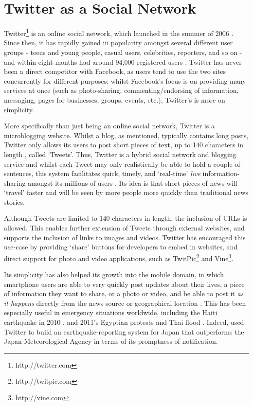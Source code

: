 \section{Twitter as a Social Network}
Twitter\footnote{http://twitter.com} is an online social network, which launched in the summer of 2006 \cite{krishnamurthy08}. Since then, it has rapidly gained in popularity amongst several different user groups - teens and young people, casual users, celebrities, reporters, and so on - and within eight months had around 94,000 registered users \cite{java07}. Twitter has never been a direct competitor with Facebook, as users tend to use the two sites concurrently for different purposes: whilst Facebook's focus is on providing many services at once (such as photo-sharing, commenting/endorsing of information, messaging, pages for businesses, groups, events, etc.), Twitter's is more on simplicity.

More specifically than just being an online social network, Twitter is a microblogging website. Whilst a blog, as mentioned, typically contains long posts, Twitter only allows its users to post short pieces of text, up to 140 characters in length \cite{krishnamurthy08, huberman08}, called `Tweets'. Thus, Twitter is a hybrid social network and blogging service and whilst each Tweet may only realistically be able to hold a couple of sentences, this system facilitates quick, timely, and `real-time' \textit{live} information-sharing amongst its millions of users \cite{zhao09}. Its idea is that short pieces of news will `travel' faster and will be seen by more people more quickly than traditional news stories.

Although Tweets are limited to 140 characters in length, the inclusion of URLs is allowed. This enables further extension of Tweets through external websites, and supports the inclusion of links to images and videos. Twitter has encouraged this use-case by providing `share' buttons for developers to embed in websites, and direct support for photo and video applications, such as TwitPic\footnote{http://twitpic.com} and Vine\footnote{http://vine.com}.

Its simplicity has also helped its growth into the mobile domain, in which smartphone users are able to very quickly post updates about their lives, a piece of information they want to share, or a photo or video, and be able to post it \textit{as it happens} directly from the news source or geographical location \cite{castillo11}. This has been especially useful in emergency situations worldwide, including the Haiti earthquake in 2010 \cite{muralidharan11}, and 2011's Egyptian protests \cite{wilson11} and Thai flood \cite{kongthon12}. Indeed, \citet{sakaki10} used Twitter to build an earthquake-reporting system for Japan that outperforms the Japan Meteorological Agency in terms of its promptness of notification.

